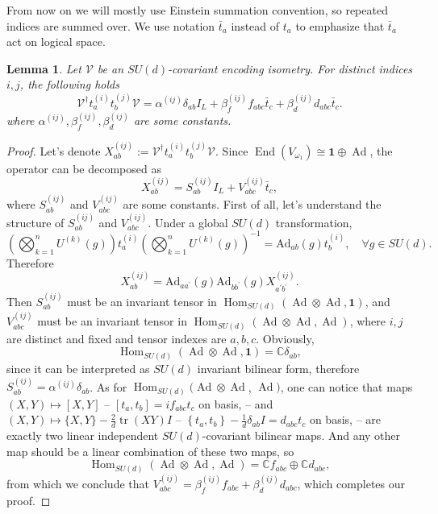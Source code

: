 \documentclass[11pt,letterpaper]{article}
\theoremstyle{plain}
\theoremstyle{plain}
\theoremstyle{plain}
\theoremstyle{plain}
\theoremstyle{plain}
\theoremstyle{plain}
\theoremstyle{plain}
\newtheorem{smlemma}[smtheorem]{Lemma}
\theoremstyle{definition}
\theoremstyle{plain}
\begin{document}
From now on we will mostly use Einstein summation convention, so repeated indices are summed over.
We use notation $\bar{t}_a$ instead of $t_a$ to emphasize that $\bar{t}_a$ act on logical space.

\begin{smlemma}\label{lem:2-body_action}
Let $\mathcal{V}$ be an $SU(d)$-covariant encoding isometry. For distinct indices $i, j$, the following holds
\[
    \mathcal{V}^{\dagger} t_a^{(i)} t_b^{(j)} \mathcal{V}=\alpha^{(i j)} \delta_{a b} I_L+\beta^{(i j)}_{f} f_{abc} \bar{t}_c+\beta^{(i j)}_{d} d_{abc} \bar{t}_c .
\]
where $\alpha^{(i j)}, \beta^{(i j)}_{f}, \beta^{(i j)}_{d}$ are some constants.
\end{smlemma}
\begin{proof}
    Let's denote $X_{a b}^{(i j)}:=\mathcal{V}^{\dagger} t_a^{(i)} t_b^{(j)} \mathcal{V}$. Since $\operatorname{End}\left(V_{\omega_1}\right) \cong \mathbf{1} \oplus \operatorname{Ad}$,
    the operator can be decomposed as
    \[
        X_{a b}^{(i j)}=S_{a b}^{(i j)} I_L+V_{abc}^{(i j)} \bar{t}_c,
    \]
    where $S_{a b}^{(i j)}$ and $V_{abc}^{(i j)}$ are some constants.
    First of all, let's understand the structure of $S_{a b}^{(i j)}$ and $V_{abc}^{(i j)}$. 
    Under a global $SU(d)$ transformation,
    $$
    \left(\bigotimes_{k=1}^n U^{(k)}(g)\right) t_a^{(i)} \left(\bigotimes_{k=1}^n U^{(k)}(g)\right)^{-1}=\mathrm{Ad}_{ab}(g) t_b^{(i)}, \quad \forall g \in SU(d).
    $$
    Therefore
    $$
    X_{a b}^{(i j)}=\mathrm{Ad}_{a a^{\prime}}(g) \mathrm{Ad}_{b b^{\prime}}(g) X_{a^{\prime} b^{\prime}}^{(i j)} .
    $$
    Then $S_{ab}^{(i j)}$ must be an invariant tensor in $\operatorname{Hom}_{SU(d)}(\operatorname{Ad} \otimes \operatorname{Ad}, \mathbf{1})$, and
    $V_{abc}^{(i j)}$ must be an invariant tensor in $\operatorname{Hom}_{SU(d)}(\operatorname{Ad} \otimes \operatorname{Ad}, \operatorname{Ad})$, where $i, j$ are distinct and fixed and tensor indexes are $a, b, c$.
    Obviously, 
    $$
    \operatorname{Hom}_{S U(d)}(\operatorname{Ad} \otimes \operatorname{Ad}, \mathbf{1})=\mathbb{C} \delta_{a b},
    $$
    since it can be interpreted as $SU(d)$ invariant bilinear form, therefore $S_{a b}^{(i j)}=\alpha^{(i j)}\delta_{ab}$. 
    As for $\operatorname{Hom}_{SU(d)}(\operatorname{Ad} \otimes \operatorname{Ad}$, $\operatorname{Ad})$, one can notice that maps $(X, Y) \mapsto[X, Y]$ -- $\left[t_a, t_b\right]=i f_{abc} t_c$ on basis, -- and $(X, Y) \mapsto\{X, Y\}-\frac{2}{d} \operatorname{tr}(X Y) I$ -- 
    $\left\{t_a, t_b\right\}-\frac{1}{d} \delta_{a b} I=d_{abc} t_c$ on basis, -- are exactly two linear independent $SU(d)$-covariant bilinear maps. And any other map should be a linear combination of these two maps,
    so 
    $$
    \operatorname{Hom}_{SU(d)}(\operatorname{Ad} \otimes \operatorname{Ad}, \operatorname{Ad})=\mathbb{C} f_{abc} \oplus \mathbb{C} d_{abc},
    $$ 
    from which we conclude that $V_{abc}^{(i j)}=\beta^{(i j)}_{f} f_{abc}+\beta^{(i j)}_{d} d_{abc}$, which completes our proof.
\end{proof}
\end{document}
